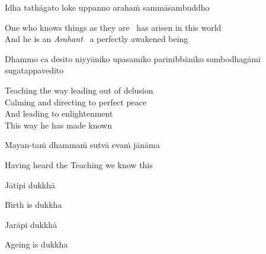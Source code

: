 Idha tathāgato loke uppanno arahaṁ sammāsambuddho

\begin{english}
    One who knows things as they are \breathmark\ has arisen in this world\makeatletter\hyperlink{endnote12-appendix}\makeatother\\

  And he is an \textit{Arahant} \breathmark\ a perfectly awakened being
\end{english}

\begin{pali-hang}
  Dhammo ca desito niyyāniko upasamiko parinibbāniko sambodhagāmī sugatappavedito
\end{pali-hang}

\begin{english-verses}
    Teaching the way leading out of delusion\makeatletter\hyperlink{endnote13-appendix}\makeatother\\

  Calming and directing to perfect peace\\
  And leading to enlightenment\\
  This way he has made known\\
\end{english-verses}

Mayan-taṁ dhammaṁ sutvā evaṁ jānāma

\begin{english}
  Having heard the Teaching we know this
\end{english}

Jātipi dukkhā

\begin{english}
  Birth is dukkha
\end{english}

Jarāpi dukkhā

\begin{english}
  Ageing is dukkha
\end{english}

